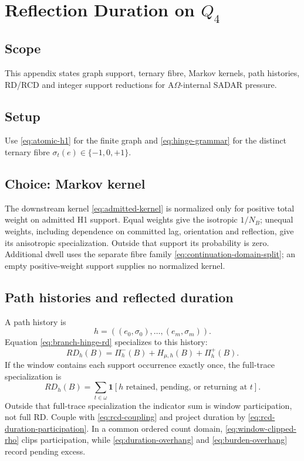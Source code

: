 \section{Reflection Duration on \texorpdfstring{\(Q_4\)}{Q4}}
\label{app:combinatorics-rd-tests}

\subsection{Scope}\label{app:rd-tests:scope}
This appendix states graph support, ternary fibre, Markov kernels, path histories,
RD/RCD and integer support reductions for A\(\Omega\)-internal SADAR pressure.

\subsection{Setup}\label{app:rd-tests:setup}
Use \eqref{eq:atomic-h1} for the finite graph and
\eqref{eq:hinge-grammar} for the distinct ternary fibre
\(\sigma_t(e)\in\{-1,0,+1\}\).

\subsection{Choice: Markov kernel}\label{app:rd-tests:markov-kernel}
The downstream kernel \eqref{eq:admitted-kernel} is normalized only for
positive total weight on admitted H1 support. Equal weights give the isotropic
\(1/N_B\); unequal weights, including dependence on committed lag, orientation
and reflection, give its anisotropic specialization. Outside that support its
probability is zero. Additional dwell uses the separate fibre family
\eqref{eq:continuation-domain-split}; an empty positive-weight support supplies
no normalized kernel.

\subsection{Path histories and reflected duration}\label{app:rd-tests:statements}
A path history is
\[
h=((e_0,\sigma_0),\ldots,(e_m,\sigma_m)).
\]
Equation \eqref{eq:branch-hinge-rd} specializes to this history:
\begin{equation}
RD_h(B)
=
\Pi^-_h(B)
+
H_{\mu,h}(B)
+
\Pi^+_h(B).
\label{app:rd:eq:branch-hinge-rd}
\end{equation}
If the window contains each support occurrence exactly once, the full-trace
specialization is
\[
RD_h(B)=
\sum_{t\in\omega}
\mathbf 1[h\text{ retained, pending, or returning at }t].
\]
Outside that full-trace specialization the indicator sum is window participation, not full RD. Couple with \eqref{eq:rcd-coupling} and project duration by
\eqref{eq:rcd-duration-participation}. In a common ordered count domain,
\eqref{eq:window-clipped-rho} clips participation, while
\eqref{eq:duration-overhang} and \eqref{eq:burden-overhang} record pending excess.


